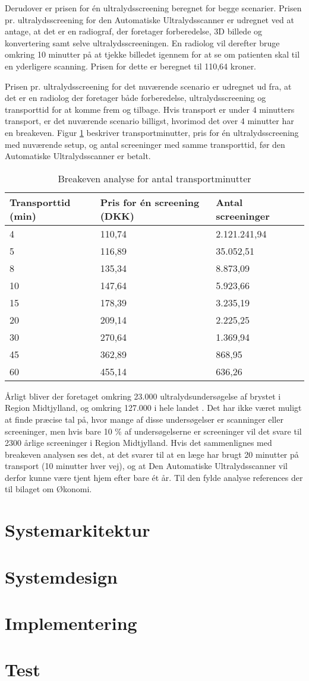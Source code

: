 Derudover er prisen for én ultralydsscreening beregnet for begge scenarier. Prisen pr. ultralydsscreening for den Automatiske Ultralydsscanner er udregnet ved at antage, at det er en radiograf, der foretager forberedelse, 3D billede og konvertering samt selve ultralydsscreeningen. En radiolog vil derefter bruge omkring 10 minutter på at tjekke billedet igennem for at se om patienten skal til en yderligere scanning.  Prisen for dette er beregnet til 110,64 kroner. 

Prisen pr. ultralydsscreening for det nuværende scenario er udregnet ud fra, at det er en radiolog der foretager både forberedelse, ultralydsscreening og transporttid for at komme frem og tilbage.  Hvis transport er under 4 minutters transport, er det nuværende scenario billigst, hvorimod det over 4 minutter har en breakeven. Figur \ref{Breakeven} beskriver transportminutter, pris for én ultralydsscreening med nuværende setup, og antal screeninger med samme transporttid, før den Automatiske Ultralydsscanner er betalt. 

\begin{table}[htb]
\begin{tabular}{ | l | l | l | p{} | }
\hline
\textbf{Transporttid (min)} & \textbf{Pris for én screening (DKK)} & \textbf{Antal screeninger} \\\hline
4 & 110,74 & 2.121.241,94 \\\hline
5 & 116,89 & 35.052,51 \\\hline
8 & 135,34 & 8.873,09\\\hline
10 & 147,64 & 5.923,66\\\hline
15 & 178,39 & 3.235,19 \\\hline
20 & 209,14 & 2.225,25\\\hline
30 & 270,64 & 1.369,94\\\hline
45 & 362,89 & 868,95 \\\hline
60 & 455,14 & 636,26 \\\hline
\end{tabular}
\caption{Breakeven analyse for antal transportminutter}
\label{Breakeven}
\end{table}

Årligt bliver der foretaget omkring 23.000 ultralydsundersøgelse af brystet i Region Midtjylland, og omkring 127.000 i hele landet . Det har ikke været muligt at finde præcise tal på, hvor mange af disse undersøgelser er scanninger eller screeninger, men hvis bare 10 \% af undersøgelserne er screeninger vil det svare til 2300 årlige screeninger i Region Midtjylland. Hvis det sammenlignes med breakeven analysen ses det, at det svarer til at en læge har brugt 20 minutter på transport (10 minutter hver vej), og at Den Automatiske Ultralydsscanner vil derfor kunne være tjent hjem efter bare ét år. Til den fylde analyse references der til bilaget om Økonomi.  

\section{Systemarkitektur}
\section{Systemdesign}
\section{Implementering}
\section{Test}